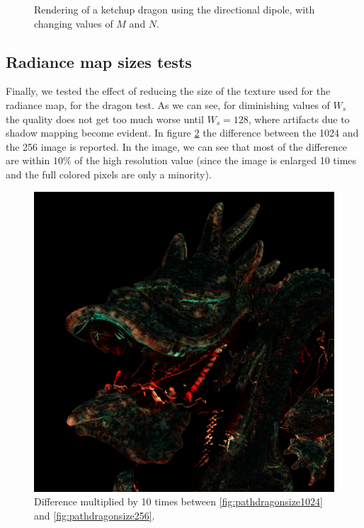 \begin{figure}
{}
\label{fig:pathdragon}
\caption{Rendering of a ketchup dragon using the directional dipole, with changing values of $M$ and $N$. }
\end{figure}

\clearpage
\subsection{Radiance map sizes tests}
Finally, we tested the effect of reducing the size of the texture used for the radiance map, for the dragon test. As we can see, for diminishing values of $W_s$ the quality does not get too much worse until $W_s = 128$, where artifacts due to shadow mapping become evident. In figure \ref{fig:pathdragonsizett} the difference between the 1024 and the 256 image is reported. In the image, we can see that most of the difference are within $10\%$ of the high resolution value (since the image is enlarged 10 times and the full colored pixels are only a minority).

\begin{figure}[!h]
\centering
  \includegraphics[width=0.7 \linewidth]{images/results/difference.png}
\caption{Difference multiplied by 10 times between \ref{fig:pathdragonsize1024} and \ref{fig:pathdragonsize256}.}
\label{fig:pathdragonsizett}
\end{figure}

